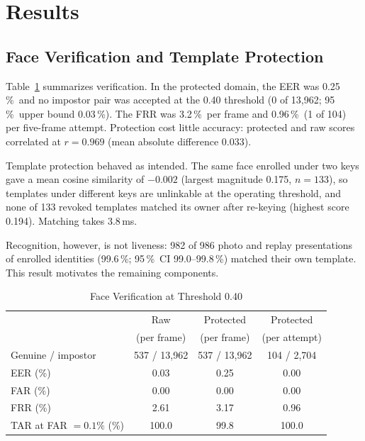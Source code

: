 \documentclass{ieeeaccess}
\newcommand{\pct}{\,\%}
\begin{document}
\section{Results}
\label{sec:results}

\subsection{Face Verification and Template Protection}
\label{sec:res-face}
Table~\ref{tab:face} summarizes verification. In the protected domain, the EER was 0.25\pct\ and no
impostor pair was accepted at the 0.40 threshold (0 of 13,962; 95\pct\ upper bound 0.03\pct). The FRR
was 3.2\pct\ per frame and 0.96\pct\ (1 of 104) per five-frame attempt. Protection cost little
accuracy: protected and raw scores correlated at $r=0.969$ (mean absolute difference 0.033).

Template protection behaved as intended. The same face enrolled under two keys gave a mean cosine
similarity of $-0.002$ (largest magnitude 0.175, $n=133$), so templates under different keys are
unlinkable at the operating threshold, and none of 133 revoked templates matched its owner after
re-keying (highest score 0.194). Matching takes 3.8\,ms.

Recognition, however, is not liveness: 982 of 986 photo and replay presentations of enrolled identities
(99.6\pct; 95\pct\ CI 99.0--99.8\pct) matched their own template. This result motivates the
remaining components.

\begin{table}[!t]
\caption{Face Verification at Threshold 0.40}
\label{tab:face}
\centering
\footnotesize
\setlength{\tabcolsep}{4pt}
\begin{tabular}{lccc}
\toprule
 & Raw & Protected & Protected \\
 & (per frame) & (per frame) & (per attempt) \\
\midrule
Genuine / impostor & 537 / 13,962 & 537 / 13,962 & 104 / 2,704 \\
EER (\%) & 0.03 & 0.25 & 0.00 \\
FAR (\%) & 0.00 & 0.00 & 0.00 \\
FRR (\%) & 2.61 & 3.17 & 0.96 \\
TAR at FAR $=0.1\%$ (\%) & 100.0 & 99.8 & 100.0 \\
\bottomrule
\end{tabular}
\end{table}
\end{document}
